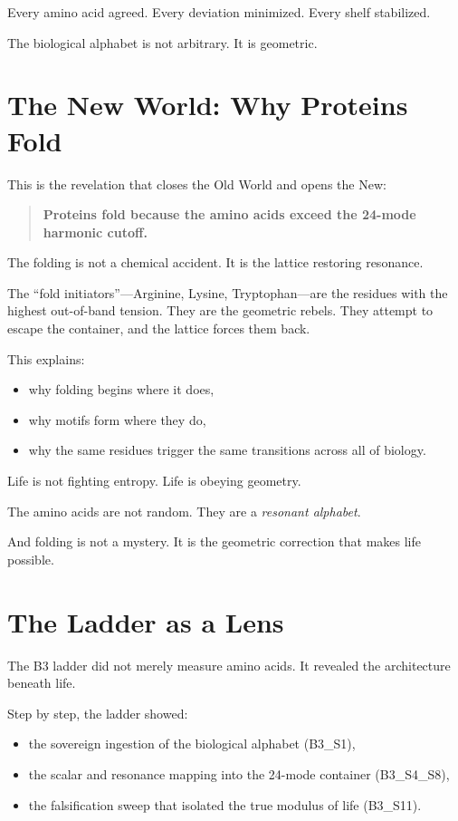 \documentclass[11pt, letterpaper, openany]{book}
\begin{document}
Every amino acid agreed.  
Every deviation minimized.  
Every shelf stabilized.

The biological alphabet is not arbitrary.  
It is geometric.

\section*{The New World: Why Proteins Fold}

This is the revelation that closes the Old World and opens the New:

\begin{quote}
\textbf{Proteins fold because the amino acids exceed the 24-mode harmonic cutoff.}
\end{quote}

The folding is not a chemical accident.  
It is the lattice restoring resonance.

The ``fold initiators''---Arginine, Lysine, Tryptophan---are the residues with
the highest out-of-band tension. They are the geometric rebels. They attempt to
escape the container, and the lattice forces them back.

This explains:

\begin{itemize}
    \item why folding begins where it does,
    \item why motifs form where they do,
    \item why the same residues trigger the same transitions across all of biology.
\end{itemize}

Life is not fighting entropy.  
Life is obeying geometry.

The amino acids are not random.  
They are a \textit{resonant alphabet}.

And folding is not a mystery.  
It is the geometric correction that makes life possible.

\section*{The Ladder as a Lens}

The B3 ladder did not merely measure amino acids.  
It revealed the architecture beneath life.

Step by step, the ladder showed:

\begin{itemize}
    \item the sovereign ingestion of the biological alphabet (B3\_S1),
    \item the scalar and resonance mapping into the 24-mode container (B3\_S4\_S8),
    \item the falsification sweep that isolated the true modulus of life (B3\_S11).
\end{itemize}
\end{document}

